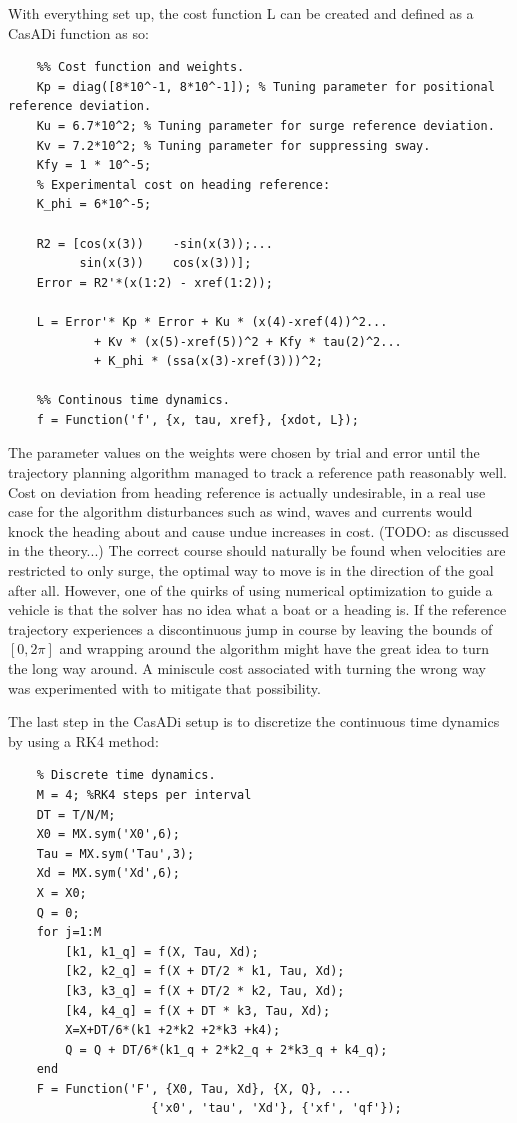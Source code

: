 With everything set up, the cost function L can be created and defined as a CasADi function as so:
\begin{lstlisting}
    %% Cost function and weights.
    Kp = diag([8*10^-1, 8*10^-1]); % Tuning parameter for positional reference deviation.
    Ku = 6.7*10^2; % Tuning parameter for surge reference deviation.
    Kv = 7.2*10^2; % Tuning parameter for suppressing sway.
    Kfy = 1 * 10^-5;
    % Experimental cost on heading reference:
    K_phi = 6*10^-5;

    R2 = [cos(x(3))    -sin(x(3));...
          sin(x(3))    cos(x(3))];
    Error = R2'*(x(1:2) - xref(1:2));

    L = Error'* Kp * Error + Ku * (x(4)-xref(4))^2...
            + Kv * (x(5)-xref(5))^2 + Kfy * tau(2)^2...
            + K_phi * (ssa(x(3)-xref(3)))^2;
    
    %% Continous time dynamics.
    f = Function('f', {x, tau, xref}, {xdot, L});    
\end{lstlisting}

The parameter values on the weights were chosen by trial and error until the trajectory planning algorithm managed
to track a reference path reasonably well. Cost on deviation from heading reference is actually undesirable, in a real use case
for the algorithm disturbances such as wind, waves and currents would knock the heading about and cause undue increases in cost.
(TODO: as discussed in the theory...) The correct course should naturally be found when velocities are restricted to only
surge, the optimal way to move is in the direction of the goal after all. However, one of the quirks of using numerical optimization 
to guide a vehicle is that the solver has no idea what a boat or a heading is. If the reference trajectory experiences a discontinuous
jump in course by leaving the bounds of $[0, 2\pi]$ and wrapping around the algorithm might have the great idea to turn the long way around.
A miniscule cost associated with turning the wrong way was experimented with to mitigate that possibility.

The last step in the CasADi setup is to discretize the continuous time dynamics by using a \gls{RK4} method:
\begin{lstlisting}
    % Discrete time dynamics.
    M = 4; %RK4 steps per interval
    DT = T/N/M;
    X0 = MX.sym('X0',6);
    Tau = MX.sym('Tau',3);
    Xd = MX.sym('Xd',6);
    X = X0;
    Q = 0;
    for j=1:M
        [k1, k1_q] = f(X, Tau, Xd);
        [k2, k2_q] = f(X + DT/2 * k1, Tau, Xd);
        [k3, k3_q] = f(X + DT/2 * k2, Tau, Xd);
        [k4, k4_q] = f(X + DT * k3, Tau, Xd);
        X=X+DT/6*(k1 +2*k2 +2*k3 +k4);
        Q = Q + DT/6*(k1_q + 2*k2_q + 2*k3_q + k4_q);
    end
    F = Function('F', {X0, Tau, Xd}, {X, Q}, ... 
                    {'x0', 'tau', 'Xd'}, {'xf', 'qf'});
\end{lstlisting}

